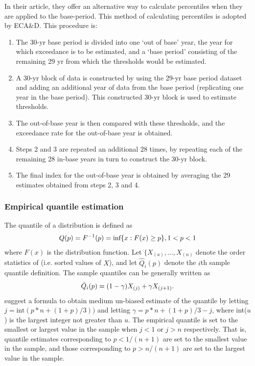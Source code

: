 \documentclass[a4paper,11pt]{article}
\begin{document}
In their article, they offer an alternative way to calculate percentiles when they are applied to the
base-period. This method of calculating percentiles is adopted by ECA\&D. This procedure is:~\citep[\S 4]{zhang:05}
\begin{enumerate}
\item The 30-yr base period is divided into one `out of base' year, the year for which exceedance is to be estimated,
and a `base period' consisting of the remaining 29 yr from which the thresholds would be estimated.
\item A 30-yr block of data is constructed by using the 29-yr base period dataset and adding an additional
year of data from the base period (replicating one year in the base period). This constructed 30-yr block
 is used to estimate thresholds. 
\item The out-of-base year is then compared with these thresholds, and the exceedance rate for the out-of-base year is obtained.
\item Steps 2 and 3 are repeated an additional 28 times, by repeating each of the remaining 28 in-base years in turn
to construct the 30-yr block.
\item The final index for the out-of-base year is obtained by averaging the 29 estimates obtained from steps 2, 3 and 4.
\end{enumerate}

\subsubsection{Empirical quantile estimation}

The quantile of a distribution is defined as 
\begin{equation}
Q(p) = F^{-1}(p) = \text{inf} \{x : F(x) \ge p\}, 1 < p < 1 \notag
\end{equation}
where $F(x)$ is the distribution function. Let $\{X_{(a)}, \ldots, X_{(n)}$ denote the order statistics of 
(i.e. sorted values of ${X}$), and let $\hat{Q}_i(p)$ denote the $i$th sample quantile definition. 
The sample quantiles can be generally written as
\begin{equation}
\hat{Q}_i(p) = (1 - \gamma )X_{(j)} + \gamma X_{(j+1)}. \notag
\end{equation}
\citet{hyndman:96} suggest a formula to obtain medium un-biased estimate of the quantile by letting 
$j = \text{int}(p * n + (1 + p)/3))$ and letting $\gamma = p * n + (1 + p)/3 - j$,
where int($u$) is the largest integer not greater than $u$. The empirical quantile is set to the smallest or 
largest value in the sample when $j < 1$ or $j > n$ respectively. That is, quantile estimates corresponding 
to $p < 1/(n+1)$ are set to the smallest value in the sample, and those corresponding to $p > n/(n+1)$ are set to 
the largest value in the sample.
\end{document}
